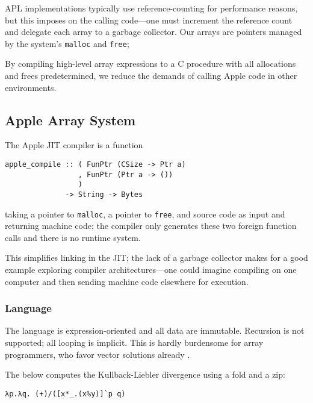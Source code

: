 \documentclass[sigplan,screen,anonymous]{acmart}
\begin{document}
APL implementations typically use reference-counting \cite[p.~47]{hui2020} for performance reasons, but this imposes on the calling code---one must increment the reference count and delegate each array to a garbage collector. Our arrays are pointers managed by the system's {\tt malloc} and {\tt free};

By compiling high-level array expressions to a C procedure with all allocations and frees predetermined, we reduce the demands of calling Apple code in other environments.




\subsection{Apple Array System}

The Apple JIT compiler is a function
\begin{verbatim}
apple_compile :: ( FunPtr (CSize -> Ptr a)
                 , FunPtr (Ptr a -> ())
                 )
              -> String -> Bytes
\end{verbatim}
taking a pointer to {\tt malloc}, a pointer to {\tt free}, and source code as input and returning machine code; the compiler only generates these two foreign function calls and there is no runtime system.

This simplifies linking in the JIT; the lack of a garbage collector makes for a good example exploring compiler architectures---one could imagine compiling on one computer and then sending machine code elsewhere for execution.

\subsubsection{Language}

The language is expression-oriented and all data are immutable. Recursion is not supported; all looping is implicit. This is hardly burdensome for array programmers, who favor vector solutions already \cite[Chapter.~31]{stokes2015}.

The below computes the Kullback-Liebler divergence using a fold and a zip:

\begin{verbatim}
λp.λq. (+)/([x*_.(x%y)]`p q)
\end{verbatim}
\end{document}
